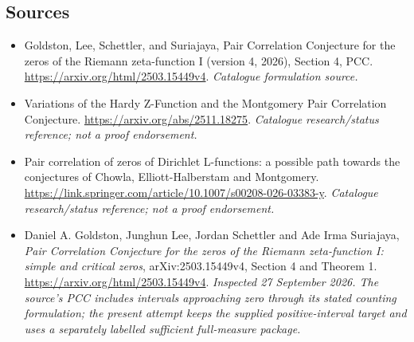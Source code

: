 \documentclass[11pt,a4paper]{article}
\numberwithin{equation}{section}
\begin{document}
\subsection{Sources}
\begin{itemize}\raggedright
\item[\textnormal{[S1]}]\hypertarget{source:1277:1}{} Goldston, Lee, Schettler, and Suriajaya, Pair Correlation Conjecture for the zeros of the Riemann zeta-function I (version 4, 2026), Section 4, PCC.
\url{https://arxiv.org/html/2503.15449v4}.
{\small\textit{Catalogue formulation source.}}
\item[\textnormal{[S2]}]\hypertarget{source:1277:2}{} Variations of the Hardy Z-Function and the Montgomery Pair Correlation Conjecture.
\url{https://arxiv.org/abs/2511.18275}.
{\small\textit{Catalogue research/status reference; not a proof endorsement.}}
\item[\textnormal{[S3]}]\hypertarget{source:1277:3}{} Pair correlation of zeros of Dirichlet L-functions: a possible path towards the conjectures of Chowla, Elliott-Halberstam and Montgomery.
\url{https://link.springer.com/article/10.1007/s00208-026-03383-y}.
{\small\textit{Catalogue research/status reference; not a proof endorsement.}}
\item[\textnormal{[E1]}]\hypertarget{extra:1277:1}{} Daniel A. Goldston,
Junghun Lee, Jordan Schettler and Ade Irma Suriajaya,
\emph{Pair Correlation Conjecture for the zeros of the Riemann zeta-function I:
simple and critical zeros}, arXiv:2503.15449v4, Section 4 and Theorem 1.
\url{https://arxiv.org/html/2503.15449v4}.
{\small\textit{Inspected 27 September 2026. The source's PCC includes
intervals approaching zero through its stated counting formulation;
the present attempt keeps the supplied positive-interval target and uses
a separately labelled sufficient full-measure package.}}
\end{itemize}
\end{document}
